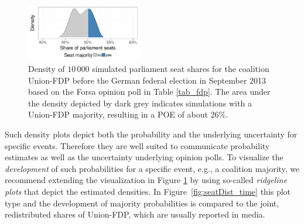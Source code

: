 \documentclass[smallcondensed]{svjour3}     %
\begin{document}
\begin{figure}[H]\centering
\includegraphics[width=0.45\textwidth]{figures/2013_forsa_cdufdp_lastPreelectionPoll.pdf}
\caption{Density of $10\,000$ simulated parliament seat shares for the coalition
Union-FDP before the German federal election in September 2013 based on the Forsa
opinion poll in Table \ref{tab_fdp}. The area under the density depicted by
dark grey indicates simulations with a Union-FDP majority, resulting in a
POE of about $26\%$.
\label{fig:seatDist}
}
\end{figure}

Such density plots depict both the probability and the underlying
uncertainty for specific events. Therefore they are well suited to communicate
probability estimates as well as the uncertainty underlying opinion polls.
To visualize the {\it development} of such probabilities
for a specific event, e.g., a coalition majority, we recommend extending the
visualization in Figure \ref{fig:seatDist} by using so-called
\emph{ridgeline plots} \citep{wilke_2017} that depict the estimated densities.
In Figure~\ref{fig:seatDist_time} this plot type and the development of majority
probabilities is compared to the joint, redistributed shares of Union-FDP, which
are usually reported in media.
\end{document}

